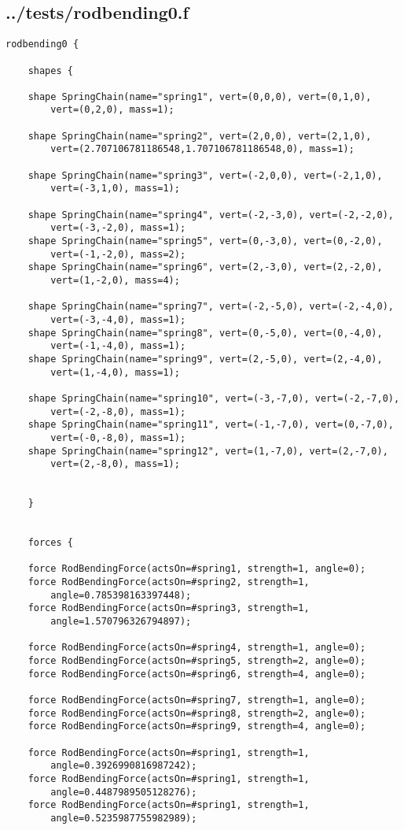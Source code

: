 \subsection*{../tests/rodbending0.f}
\begin{lstlisting}
rodbending0 {

    shapes {

	shape SpringChain(name="spring1", vert=(0,0,0), vert=(0,1,0),
		vert=(0,2,0), mass=1);

	shape SpringChain(name="spring2", vert=(2,0,0), vert=(2,1,0),
		vert=(2.707106781186548,1.707106781186548,0), mass=1);

	shape SpringChain(name="spring3", vert=(-2,0,0), vert=(-2,1,0),
		vert=(-3,1,0), mass=1);

	shape SpringChain(name="spring4", vert=(-2,-3,0), vert=(-2,-2,0),
		vert=(-3,-2,0), mass=1);
	shape SpringChain(name="spring5", vert=(0,-3,0), vert=(0,-2,0),
		vert=(-1,-2,0), mass=2);
	shape SpringChain(name="spring6", vert=(2,-3,0), vert=(2,-2,0),
		vert=(1,-2,0), mass=4);

	shape SpringChain(name="spring7", vert=(-2,-5,0), vert=(-2,-4,0),
		vert=(-3,-4,0), mass=1);
	shape SpringChain(name="spring8", vert=(0,-5,0), vert=(0,-4,0),
		vert=(-1,-4,0), mass=1);
	shape SpringChain(name="spring9", vert=(2,-5,0), vert=(2,-4,0),
		vert=(1,-4,0), mass=1);

	shape SpringChain(name="spring10", vert=(-3,-7,0), vert=(-2,-7,0),
		vert=(-2,-8,0), mass=1);
	shape SpringChain(name="spring11", vert=(-1,-7,0), vert=(0,-7,0),
		vert=(-0,-8,0), mass=1);
	shape SpringChain(name="spring12", vert=(1,-7,0), vert=(2,-7,0),
		vert=(2,-8,0), mass=1);

	
    }


    forces {
	
	force RodBendingForce(actsOn=#spring1, strength=1, angle=0);
	force RodBendingForce(actsOn=#spring2, strength=1,
		angle=0.785398163397448);
	force RodBendingForce(actsOn=#spring3, strength=1,
		angle=1.570796326794897);

	force RodBendingForce(actsOn=#spring4, strength=1, angle=0);
	force RodBendingForce(actsOn=#spring5, strength=2, angle=0);
	force RodBendingForce(actsOn=#spring6, strength=4, angle=0);

	force RodBendingForce(actsOn=#spring7, strength=1, angle=0);
	force RodBendingForce(actsOn=#spring8, strength=2, angle=0);
	force RodBendingForce(actsOn=#spring9, strength=4, angle=0);

	force RodBendingForce(actsOn=#spring1, strength=1,
		angle=0.3926990816987242);
	force RodBendingForce(actsOn=#spring1, strength=1,
		angle=0.4487989505128276);
	force RodBendingForce(actsOn=#spring1, strength=1,
		angle=0.5235987755982989);



\end{lstlisting}
